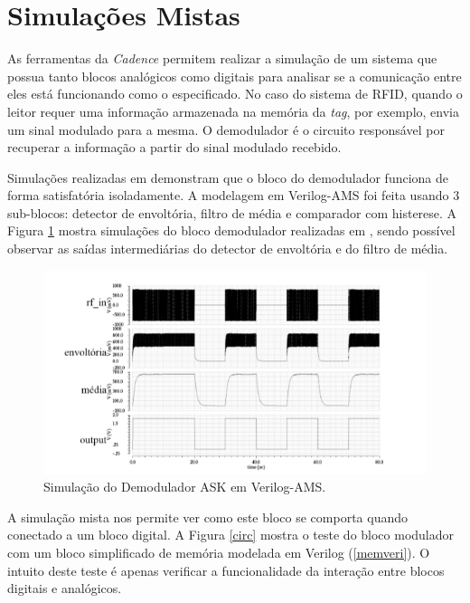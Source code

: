 \section{Simulações Mistas}

As ferramentas da \textit{Cadence} permitem realizar a simulação de um sistema que possua tanto blocos analógicos como digitais para analisar se a comunicação entre eles está funcionando como o especificado. No caso do sistema de RFID, quando o leitor requer uma informação armazenada na memória da \textit{tag}, por exemplo, envia um sinal modulado para a mesma. O demodulador é o circuito responsável por recuperar a informação a partir do sinal modulado recebido.

Simulações realizadas em \cite{Marlon} demonstram que o bloco do demodulador funciona de forma satisfatória isoladamente. A modelagem em Verilog-AMS foi feita usando 3 sub-blocos: detector de envoltória, filtro de média e comparador com histerese. A Figura \ref{dem} mostra simulações do bloco demodulador realizadas em \cite{Marlon}, sendo possível observar as saídas intermediárias do detector de envoltória e do filtro de média.

\begin{figure}[ht!]
  \centering
  \includegraphics[width=\textwidth]{figuras/dem.PNG}
  \caption{Simulação do Demodulador ASK em Verilog-AMS\cite{Marlon}.}
  \label{dem}
\end{figure}

A simulação mista nos permite ver como este bloco se comporta quando conectado a um bloco digital. A Figura \ref{circ} mostra o teste do bloco modulador com um bloco simplificado de memória modelada em Verilog (\ref{memveri}). O intuito deste teste é apenas verificar a funcionalidade da interação entre blocos digitais e analógicos.

